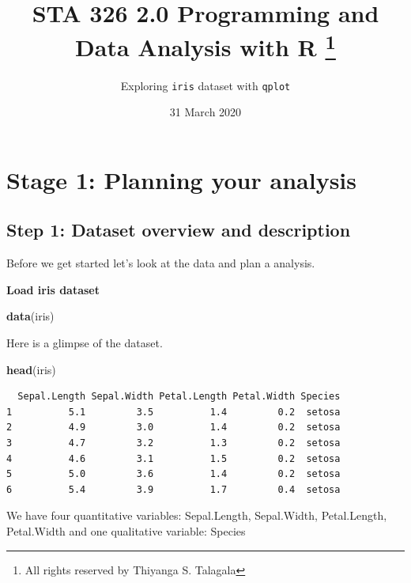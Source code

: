 \documentclass[]{article}
\title{STA 326 2.0 Programming and Data Analysis with R \footnote{All rights
  reserved by Thiyanga S. Talagala}}
\subtitle{Exploring \texttt{iris} dataset with \texttt{qplot}}
\author{}
\date{\vspace{-2.5em}31 March 2020}
\newenvironment{Shaded}{\begin{snugshade}}{\end{snugshade}}
\newcommand{\KeywordTok}[1]{\textcolor[rgb]{0.13,0.29,0.53}{\textbf{#1}}}
\newcommand{\NormalTok}[1]{#1}
\begin{document}
\maketitle

{
\setcounter{tocdepth}{3}
\tableofcontents
}
\newpage

\hypertarget{stage-1-planning-your-analysis}{%
\section{Stage 1: Planning your
analysis}\label{stage-1-planning-your-analysis}}

\hypertarget{step-1-dataset-overview-and-description}{%
\subsection{Step 1: Dataset overview and
description}\label{step-1-dataset-overview-and-description}}

Before we get started let's look at the data and plan a analysis.

\textbf{Load iris dataset}

\begin{Shaded}
\begin{Highlighting}[]
\KeywordTok{data}\NormalTok{(iris)}
\end{Highlighting}
\end{Shaded}

Here is a glimpse of the dataset.

\begin{Shaded}
\begin{Highlighting}[]
\KeywordTok{head}\NormalTok{(iris)}
\end{Highlighting}
\end{Shaded}

\begin{verbatim}
  Sepal.Length Sepal.Width Petal.Length Petal.Width Species
1          5.1         3.5          1.4         0.2  setosa
2          4.9         3.0          1.4         0.2  setosa
3          4.7         3.2          1.3         0.2  setosa
4          4.6         3.1          1.5         0.2  setosa
5          5.0         3.6          1.4         0.2  setosa
6          5.4         3.9          1.7         0.4  setosa
\end{verbatim}

We have four quantitative variables: Sepal.Length, Sepal.Width,
Petal.Length, Petal.Width and one qualitative variable: Species
\end{document}
